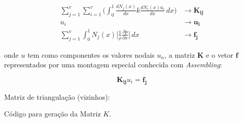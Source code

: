 \begin{align}
	\sum\limits_{j=1}^v
	\sum\limits_{i=1}^v 
	\bigg(
	\int_{0}^{1}  
	\frac{dN_j(x)}{dx} 
	k
	\frac{d N_i(x) u_i}{dx} 
	\, dx
	\bigg)
	&\longrightarrow
	\mathbf{K_{ij}}
	\\
	u_i
	&\longrightarrow
	\mathbf{u_{i}}
	\\
	\sum\limits_{j=1}^v
	\int_{0}^{1}  
	N_j(x) 
	\bigg[ \frac{1}{\rho} \frac{\partial p}{\partial x} \bigg]
	\, dx
	&\longrightarrow
	\mathbf{f_{j}}
\end{align}


\noindent onde $u$ tem como componentes os valores nodais $u_n$, a
matriz $\mathbf{K}$ e o vetor $\mathbf{f}$ representados por uma
montagem especial conhecida com \emph{Assembling}:

\begin{equation}
	\mathbf{K_{ij}} u_i = \mathbf{f_j} 
\end{equation}

Matriz de triangulação (vizinhos):

\vspace{1cm}

Código para geração da Matriz $K$.





